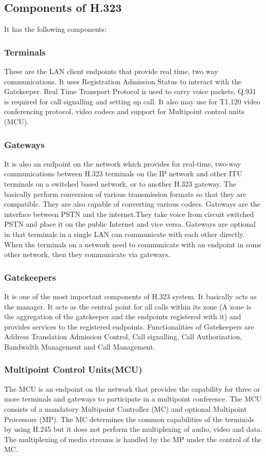 \documentclass[12pt]{Book}
\begin{document}
    \subsection{Components of H.323}
    It has the following components:
    \subsubsection{Terminals}
    These are the LAN client endpoints that provide real time, two way communications. It uses Registration Admission Status to interact with the Gatekeeper. Real Time Transport Protocol is used to carry voice packets. Q.931 is required for call signalling and setting up call. It also may use for T1.120 video conferencing protocol, video codecs and support for Multipoint control units (MCU).
    \subsubsection{Gateways}
    It is also an endpoint on the network which provides for real-time, two-way communications between H.323
terminals on the IP network and other ITU terminals on a switched based network, or to another H.323 gateway. The basically perform conversion of various transmission formats so that they are compatible. They are also capable of converting various codecs. Gateways are the interface between PSTN and the internet.They take voice from circuit switched PSTN and place it on the public Internet and
vice versa. Gateways are optional in that terminals in a single LAN can communicate with each other directly. When the terminals on a network need to communicate with an endpoint in some other network, then they communicate via
gateways.
    \subsubsection{Gatekeepers}
    It is one of the most important components of H.323 system. It basically acts as the manager. It acts as the central point
for all calls within its zone (A zone is the aggregation of the gatekeeper and the endpoints registered with it) and provides
services to the registered endpoints. Functionalities of Gatekeepers are Address Translation Admission Control, Call signalling, Call Authorization, Bandwidth Management and Call Management.
    \subsubsection{Multipoint Control Units(MCU)}
    The MCU is an endpoint on the network that provides the capability for three or more terminals and gateways to
participate in a multipoint conference. The MCU consists of a mandatory Multipoint Controller (MC) and optional
Multipoint Processors (MP). The MC determines the common capabilities of the terminals by using H.245 but it does not
perform the multiplexing of audio, video and data. The multiplexing of media streams is handled by the MP under the
control of the MC.
\end{document}
